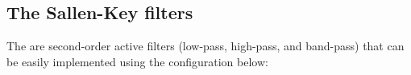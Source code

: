 \documentclass{article}
\begin{document}
\begin{comment}
\begin{equation}
\frac{V_{in}-V}{R_1}+\frac{V_{out}-V}{R_2}=\frac{V}{R_1}+\frac{V}{1/j\omega C_2}
\;\;\;\;\mbox{i.e.,}\;\;\;\;
\frac{V_{in}}{R_1}+\frac{V_{out}}{R_2}=\left( \frac{2}{R_1}+\frac{1}{R_2}+j\omega C_2 \right)V
\end{equation}
\begin{equation}
\frac{V}{R_1}+\frac{V_{out}}{1/j\omega C_1}=0,\;\;\;\;\mbox{i.e.,}\;\;\;\;
V=-j\omega R_1C_1 V_{out}
\end{equation}
Substitute into the first equation:
\begin{equation}
\frac{V_{in}}{R_1}+\frac{V_{out}}{R_2}
=-\left( \frac{2}{R_1}+\frac{1}{R_2}+j\omega C_2 \right)j\omega R_1C_1 V_{out}
=-\left( j\omega C_1 \left(\frac{2R_2+R_1}{R_2}\right)+(j\omega)^2 R_1C_1C_2 \right)V_{out}
\end{equation}
Rearrange:
\begin{eqnarray}
\frac{V_{in}}{R_1}&=&-\left(\frac{1}{R_2}+j\omega C_1\left(\frac{2R_2+R_1}{R_2}\right)+(j\omega)^2 R_1C_1C_2 \right)V_{out}
\nonumber\\
&=&-R_1C_1C_2\left(\frac{1}{R_1R_2C_1C_2}
+j\omega \left(\frac{2R_2+R_1}{R_1R_2C_2}\right)+(j\omega)^2 \right)V_{out}
\end{eqnarray}
Now we can find the FRF:
\begin{equation}
H(j\omega)=\frac{V_{out}}{V_{in}}
=-\frac{1}{R_1^2C_1C_2}\;\;\frac{1}{(j\omega)^2+j\omega \omega_n/Q+\omega_n^2}
\end{equation}
where
\begin{equation}
\omega_n=\frac{1}{\sqrt{R_1R_2C_1C_2}},\;\;\;\;
\frac{2R_2+R_1}{R_1R_2C_2}=\frac{\omega_n}{Q}=\Delta\omega,\;\;\;\mbox{i.e.,}\;\;\;
Q=\omega_n\frac{R_1R_2C_2}{2R_2+R_1}=\frac{\sqrt{R_1R_2C_1C_2}}{C_1(2R_2+R_1)}
\end{equation}
This is a 2nd-order low-pass filter, when $\omega=0$, we have
\begin{equation}
H(j\omega)\big|_{\omega=0}=H(j0)=-\frac{1}{R_1^2C_1C_2}\;\frac{1}{\omega_n^2}
=-\frac{R_1R_2C_1C_2}{R_1^2C_1C_2}=-\frac{R_2}{R_1}
\end{equation}
\end{comment}

\subsection{The Sallen-Key filters}

The
are second-order active filters (low-pass, high-pass, and band-pass) that 
can be easily implemented using the configuration below:
\end{document}
